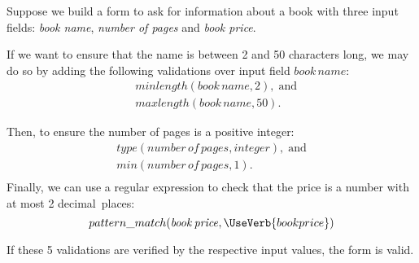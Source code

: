 \begin{example} \label{ex:book-validation}
\parindent0pt
Suppose we build a form to ask for information about a book with three input fields: \textit{book name}, \textit{number of pages} and \textit{book price}. 

If we want to ensure that the name is between 2 and 50 characters long, we may do so by adding the following validations over input field \(\mathit{book\,name}\):
\begin{equation*}
\begin{split}
    &minlength(\mathit{book\,name}, 2),\;\text{and}\\
    &maxlength(\mathit{book\,name}, 50).
\end{split}
\end{equation*}

Then, to ensure the number of pages is a positive integer:
\begin{equation*}
\begin{gathered}
    type(\mathit{number\,of\,pages}, integer),\;\text{and}\\
    min(\mathit{number\,of\,pages}, 1).\\
\end{gathered}
\end{equation*}
Finally, we can use a regular expression to check that the price is a number with at most 2 decimal~places:
\[pattern\_match(\mathit{book\,price}, \UseVerb{bookprice})\]

If these 5 validations are verified by the respective input values, the form is valid.
\end{example}


